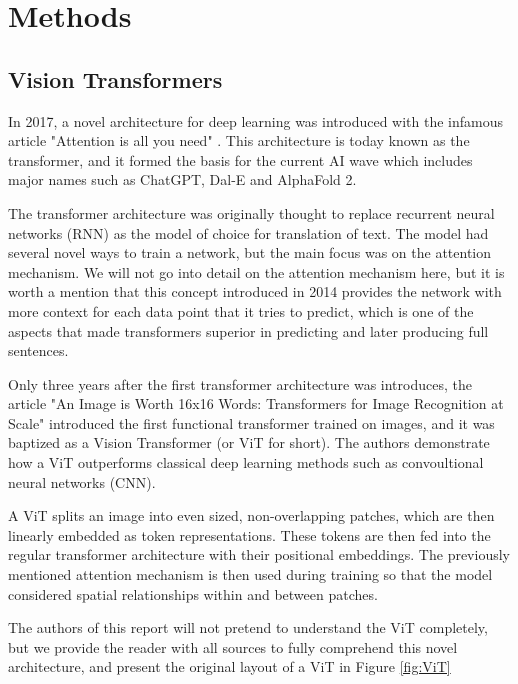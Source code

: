 \section{Methods}\label{sec:methods}

%

\subsection{Vision Transformers} %
In 2017, a novel architecture for deep learning was introduced with the infamous article 
"Attention is all you need" \cite{attention}. This architecture is today known as the 
transformer, and it formed the basis for the current AI wave which includes major 
names such as ChatGPT, Dal-E and AlphaFold 2.

The transformer architecture was originally thought to replace recurrent neural networks (RNN)
as the model of choice for translation of text. The model had several novel ways to train a network,
but the main focus was on the attention mechanism. We will not go into detail on the attention
mechanism here, but it is worth a mention that this concept introduced in 2014 \cite{first_attention}
provides the network with more context for each data point that it tries to predict, which is one
of the aspects that made transformers superior in predicting and later producing full sentences. 

Only three years after the first transformer architecture was introduces, the article 
"An Image is Worth 16x16 Words: Transformers for Image Recognition at Scale" \cite{first_vit}
introduced the first functional transformer trained on images, and it was baptized as a Vision
Transformer (or ViT for short). The authors demonstrate how a ViT outperforms classical 
deep learning methods such as convoultional neural networks (CNN). 

A ViT splits an image into even sized, non-overlapping patches, which are then linearly embedded
as token representations. These tokens are then fed into the regular transformer architecture with 
their positional embeddings. The previously mentioned attention mechanism is then used during training
so that the model considered spatial relationships within and between patches. 

The authors of this 
report will not pretend to understand the ViT completely, but we provide the reader with all sources
to fully comprehend this novel architecture, and present the original layout of a ViT in Figure \ref{fig:ViT}

